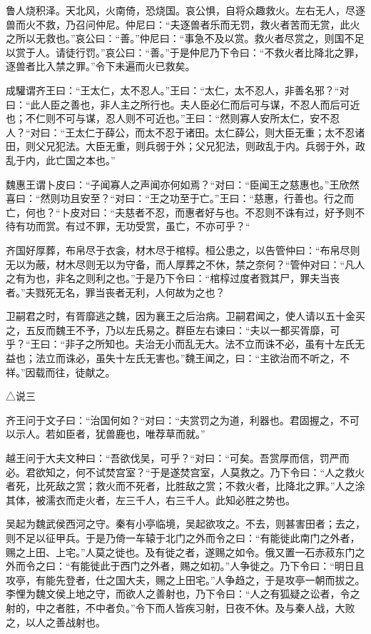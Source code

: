 \documentclass[]{article}
\begin{document}
鲁人烧积泽。天北风，火南倚，恐烧国。哀公惧，自将众趣救火。左右无人，尽逐兽而火不救，乃召问仲尼。仲尼曰：``夫逐兽者乐而无罚，救火者苦而无赏，此火之所以无救也。''哀公曰：``善。''仲尼曰：``事急不及以赏。救火者尽赏之，则国不足以赏于人。请徒行罚。''哀公曰：``善。''于是仲尼乃下令曰：``不救火者比降北之罪，逐兽者比入禁之罪。''令下未遍而火已救矣。

成驩谓齐王曰：``王太仁，太不忍人。''王曰：``太仁，太不忍人，非善名邪？``对曰：``此人臣之善也，非人主之所行也。夫人臣必仁而后可与谋，不忍人而后可近也；不仁则不可与谋，忍人则不可近也。''王曰：``然则寡人安所太仁，安不忍人？``对曰：``王太仁于薛公，而太不忍于诸田。太仁薛公，则大臣无重；太不忍诸田，则父兄犯法。大臣无重，则兵弱于外；父兄犯法，则政乱于内。兵弱于外，政乱于内，此亡国之本也。''

魏惠王谓卜皮曰：``子闻寡人之声闻亦何如焉？``对曰：``臣闻王之慈惠也。''王欣然喜曰：``然则功且安至？``对曰：``王之功至于亡。''王曰：``慈惠，行善也。行之而亡，何也？``卜皮对曰：``夫慈者不忍，而惠者好与也。不忍则不诛有过，好予则不待有功而赏。有过不罪，无功受赏，虽亡，不亦可乎？``

齐国好厚葬，布帛尽于衣衾，材木尽于棺椁。桓公患之，以告管仲曰：``布帛尽则无以为蔽，材木尽则无以为守备，而人厚葬之不休，禁之奈何？``管仲对曰：``凡人之有为也，非名之则利之也。''于是乃下令曰：``棺椁过度者戮其尸，罪夫当丧者。''夫戮死无名，罪当丧者无利，人何故为之也？

卫嗣君之时，有胥靡逃之魏，因为襄王之后治病。卫嗣君闻之，使人请以五十金买之，五反而魏王不予，乃以左氏易之。群臣左右谏曰：``夫以一都买胥靡，可乎？``王曰：``非子之所知也。夫治无小而乱无大。法不立而诛不必，虽有十左氏无益也；法立而诛必，虽失十左氏无害也。''魏王闻之，曰：``主欲治而不听之，不祥。''因载而往，徒献之。

△说三

齐王问于文子曰：``治国何如？``对曰：``夫赏罚之为道，利器也。君固握之，不可以示人。若如臣者，犹兽鹿也，唯荐草而就。''

越王问于大夫文种曰：``吾欲伐吴，可乎？``对曰：``可矣。吾赏厚而信，罚严而必。君欲知之，何不试焚宫室？``于是遂焚宫室，人莫救之。乃下令曰：``人之救火者死，比死敌之赏；救火而不死者，比胜敌之赏；不救火者，比降北之罪。''人之涂其体，被濡衣而走火者，左三千人，右三千人。此知必胜之势也。

吴起为魏武侯西河之守。秦有小亭临境，吴起欲攻之。不去，则甚害田者；去之，则不足以征甲兵。于是乃倚一车辕于北门之外而令之曰：``有能徙此南门之外者，赐之上田、上宅。''人莫之徙也。及有徙之者，遂赐之如令。俄又置一石赤菽东门之外而令之曰：``有能徙此于西门之外者，赐之如初。''人争徙之。乃下令曰：``明日且攻亭，有能先登者，仕之国大夫，赐之上田宅。''人争趋之，于是攻亭一朝而拔之。
\\
李悝为魏文侯上地之守，而欲人之善射也，乃下令曰：``人之有狐疑之讼者，令之射的，中之者胜，不中者负。''令下而人皆疾习射，日夜不休。及与秦人战，大败之，以人之善战射也。
\end{document}
